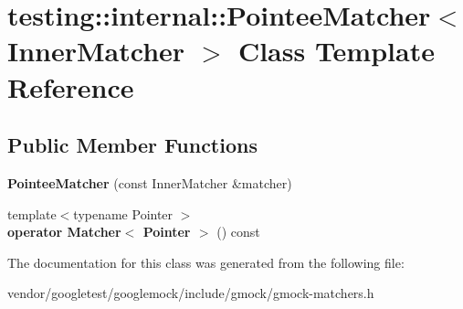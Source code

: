 \hypertarget{classtesting_1_1internal_1_1_pointee_matcher}{}\section{testing\+:\+:internal\+:\+:Pointee\+Matcher$<$ Inner\+Matcher $>$ Class Template Reference}
\label{classtesting_1_1internal_1_1_pointee_matcher}
\subsection*{Public Member Functions}
\begin{DoxyCompactItemize}
\item 
\mbox{\label{classtesting_1_1internal_1_1_pointee_matcher_ad9f7d9dbd115c50811ce82ba27f1ba56}} 
{\bfseries Pointee\+Matcher} (const Inner\+Matcher \&matcher)
\item 
\mbox{\label{classtesting_1_1internal_1_1_pointee_matcher_adec012cd8d3fa166ee89236545a57772}} 
{\footnotesize template$<$typename Pointer $>$ }\\{\bfseries operator Matcher$<$ Pointer $>$} () const
\end{DoxyCompactItemize}


The documentation for this class was generated from the following file\+:\begin{DoxyCompactItemize}
\item 
vendor/googletest/googlemock/include/gmock/gmock-\/matchers.\+h\end{DoxyCompactItemize}
